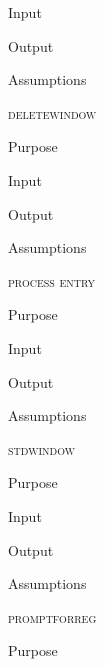\documentclass[pdftex, 11pt]{article}
\begin{document}
\begin{description}
\begin{description}
			\item{Input}


			\item{Output}


			\item{Assumptions}


		\end{description}


	\item{\textsc{deletewindow}}

		\begin{description}
			\item{Purpose}


			\item{Input}


			\item{Output}


			\item{Assumptions}


		\end{description}


	\item{\textsc{process entry}}
		\begin{description}
			\item{Purpose}


			\item{Input}


			\item{Output}


			\item{Assumptions}


		\end{description}



	\item{\textsc{stdwindow}}
		\begin{description}
			\item{Purpose}


			\item{Input}


			\item{Output}


			\item{Assumptions}


		\end{description}



	\item{\textsc{promptforreg}}
		\begin{description}
			\item{Purpose}



\end{description}
\end{description}
\end{document}
